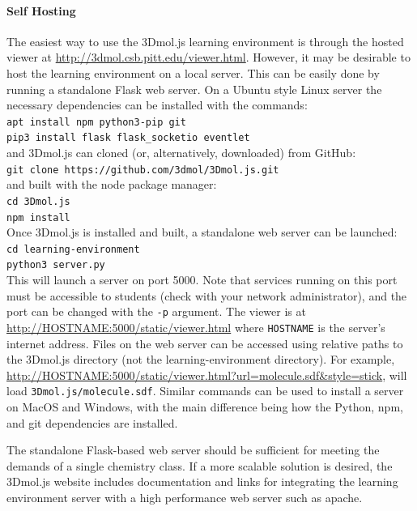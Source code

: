 \documentclass[journal=jceda8,manuscript=article]{achemso}
\begin{document}
\paragraph{Self Hosting}  The easiest way to use the 3Dmol.js learning environment is through the hosted viewer at \url{http://3dmol.csb.pitt.edu/viewer.html}.  However, it may be desirable to host the learning environment on a local server. 
 This can be easily done by running a standalone Flask web server.  On a Ubuntu style Linux server the necessary dependencies can be installed with the commands: \\
 \texttt{apt install npm python3-pip git} \\
\texttt{pip3 install flask flask\_socketio eventlet}\\
and 3Dmol.js can cloned (or, alternatively, downloaded) from GitHub: \\
\texttt{git clone https://github.com/3dmol/3Dmol.js.git} \\
and built with the node package manager: \\
\texttt{cd 3Dmol.js} \\
\texttt{npm install} \\
 Once 3Dmol.js is installed and built, a standalone web server can be launched:\\
 \texttt{cd learning-environment} \\
 \texttt{python3 server.py}\\
This will launch a server on port 5000.  Note that services running on this port must be accessible to students (check with your network administrator), and the port can be changed with the \texttt{-p} argument. The viewer is at \url{http://HOSTNAME:5000/static/viewer.html} where \texttt{HOSTNAME} is the server's internet address.  Files on the web server can be accessed using relative paths to the 3Dmol.js directory (not the learning-environment directory).   For example, \url{http://HOSTNAME:5000/static/viewer.html?url=molecule.sdf&style=stick}, will load \texttt{3Dmol.js/molecule.sdf}.  Similar commands can be used to install a server on MacOS and Windows, with the main difference being how the Python, npm, and git dependencies are installed.

The standalone Flask-based web server should be sufficient for meeting the demands of a single chemistry class.  If a more scalable solution is desired, the 3Dmol.js website includes documentation and links for integrating the learning environment server with a high performance web server such as apache.
\end{document}
